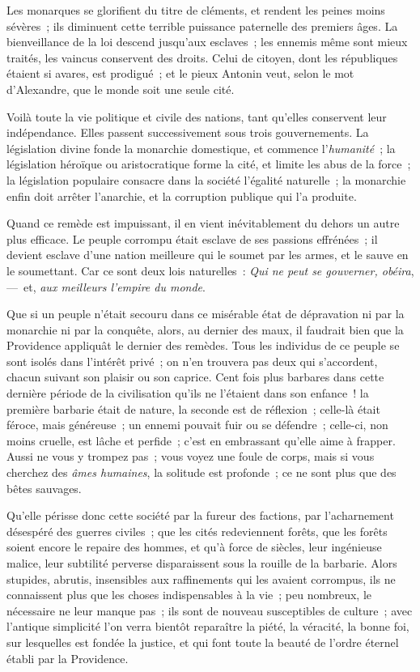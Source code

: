 \documentclass[french,twoside]{book} %
\begin{document}
Les monarques se glorifient du titre de cléments, et rendent les peines moins sévères ; ils diminuent cette terrible puissance paternelle des premiers âges. La bienveillance de la loi descend jusqu’aux esclaves ; les ennemis même sont mieux traités, les vaincus conservent des droits. Celui de citoyen,  dont les républiques étaient si avares, est prodigué ; et le pieux Antonin veut, selon le mot d’Alexandre, que le monde soit une seule cité.\par
\par
Voilà toute la vie politique et civile des nations, tant qu’elles conservent leur indépendance. Elles passent successivement sous trois gouvernements. La législation divine fonde la monarchie domestique, et commence l’{\itshape humanité} ; la législation héroïque ou aristocratique forme la cité, et limite les abus de la force ; la législation populaire consacre dans la société l’égalité naturelle ; la monarchie enfin doit arrêter l’anarchie, et la corruption publique qui l’a produite.\par
Quand ce remède est impuissant, il en vient inévitablement du dehors un autre plus efficace. Le peuple corrompu était esclave de ses passions effrénées ; il devient esclave d’une nation meilleure qui le soumet par les armes, et le sauve en le soumettant. Car ce sont deux lois naturelles : {\itshape Qui ne peut se gouverner, obéira}, — et, {\itshape aux meilleurs l’empire du monde}.\par
Que si un peuple n’était secouru dans ce misérable état de dépravation ni par la monarchie ni par la conquête, alors, au dernier des maux, il faudrait bien que la Providence appliquât le dernier des remèdes. Tous les individus de ce peuple se  sont isolés dans l’intérêt privé ; on n’en trouvera pas deux qui s’accordent, chacun suivant son plaisir ou son caprice. Cent fois plus barbares dans cette dernière période de la civilisation qu’ils ne l’étaient dans son enfance ! la première barbarie était de nature, la seconde est de réflexion ; celle-là était féroce, mais généreuse ; un ennemi pouvait fuir ou se défendre ; celle-ci, non moins cruelle, est lâche et perfide ; c’est en embrassant qu’elle aime à frapper. Aussi ne vous y trompez pas ; vous voyez une foule de corps, mais si vous cherchez des {\itshape âmes humaines}, la solitude est profonde ; ce ne sont plus que des bêtes sauvages.\par
Qu’elle périsse donc cette société par la fureur des factions, par l’acharnement désespéré des guerres civiles ; que les cités redeviennent forêts, que les forêts soient encore le repaire des hommes, et qu’à force de siècles, leur ingénieuse malice, leur subtilité perverse disparaissent sous la rouille de la barbarie. Alors stupides, abrutis, insensibles aux raffinements qui les avaient corrompus, ils ne connaissent plus que les choses indispensables à la vie ; peu nombreux, le nécessaire ne leur manque pas ; ils sont de nouveau susceptibles de culture ; avec l’antique simplicité l’on verra bientôt reparaître la piété, la véracité, la bonne foi, sur lesquelles est fondée la justice, et qui font toute  la beauté de l’ordre éternel établi par la Providence.\par
\end{document}
